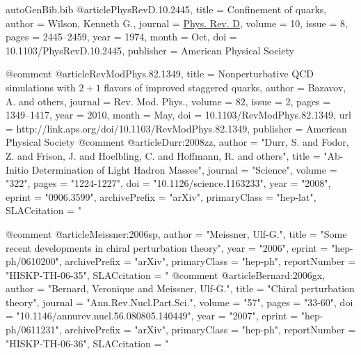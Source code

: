 \begin{filecontents*}{autoGenBib.bib}
@article{PhysRevD.10.2445,
  title = {Confinement of quarks},
  author = {Wilson, Kenneth G.},
  journal = {\href{http://link.aps.org/doi/10.1103/PhysRevD.10.2445}{Phys. Rev. D}},
  volume = {10},
  issue = {8},
  pages = {2445--2459},
  year = {1974},
  month = {Oct},
  doi = {10.1103/PhysRevD.10.2445},
  publisher = {American Physical Society}
}



@comment %
@article{RevModPhys.82.1349,
  title = {Nonperturbative QCD simulations with $2+1$ flavors of improved staggered quarks},
  author = {Bazavov, A. and others},
  journal = {Rev. Mod. Phys.},
  volume = {82},
  issue = {2},
  pages = {1349--1417},
  year = {2010},
  month = {May},
  doi = {10.1103/RevModPhys.82.1349},
  url = {http://link.aps.org/doi/10.1103/RevModPhys.82.1349},
  publisher = {American Physical Society}
}
@comment %
@article{Durr:2008zz,
      author         = "Durr, S. and Fodor, Z. and Frison, J. and Hoelbling, C.
                        and Hoffmann, R. and others",
      title          = "{Ab-Initio Determination of Light Hadron Masses}",
      journal        = "Science",
      volume         = "322",
      pages          = "1224-1227",
      doi            = "10.1126/science.1163233",
      year           = "2008",
      eprint         = "0906.3599",
      archivePrefix  = "arXiv",
      primaryClass   = "hep-lat",
      SLACcitation   = "%
}

@comment %
@article{Meissner:2006sp,
      author         = "Meissner, Ulf-G.",
      title          = "{Some recent developments in chiral perturbation theory}",
      year           = "2006",
      eprint         = "hep-ph/0610200",
      archivePrefix  = "arXiv",
      primaryClass   = "hep-ph",
      reportNumber   = "HISKP-TH-06-35",
      SLACcitation   = "%
}
@comment %
@article{Bernard:2006gx,
      author         = "Bernard, Veronique and Meissner, Ulf-G.",
      title          = "{Chiral perturbation theory}",
      journal        = "Ann.Rev.Nucl.Part.Sci.",
      volume         = "57",
      pages          = "33-60",
      doi            = "10.1146/annurev.nucl.56.080805.140449",
      year           = "2007",
      eprint         = "hep-ph/0611231",
      archivePrefix  = "arXiv",
      primaryClass   = "hep-ph",
      reportNumber   = "HISKP-TH-06-36",
      SLACcitation   = "%
}


\end{filecontents*}
